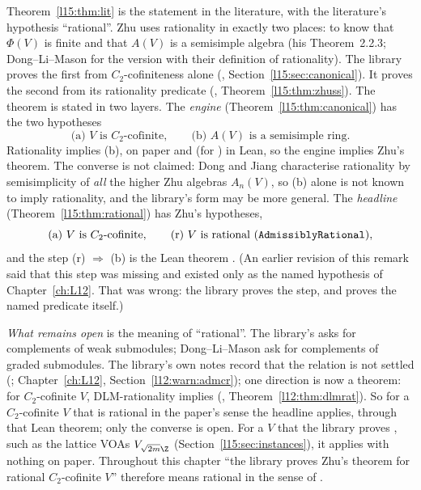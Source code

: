 \begin{remark}\label{l15:rem:hyp}
Theorem~\ref{l15:thm:lit} is the statement in the literature, with the literature's hypothesis ``rational''. Zhu uses
rationality in exactly two places: to know that $\Phi(V)$ is finite and that $A(V)$ is a semisimple algebra (his
Theorem~2.2.3; Dong--Li--Mason for the version with their definition of rationality). The library proves the first from
$C_2$-cofiniteness alone (, Section~\ref{l15:sec:canonical}). It proves the second from
its rationality predicate (\allowbreak{}\allowbreak{}, Theorem~\ref{l15:thm:zhuss}). The theorem is
stated in two layers. The \emph{engine} (Theorem~\ref{l15:thm:canonical}) has the two hypotheses
\begin{equation*}
  \text{(a) } V \text{ is } C_2\text{-cofinite},\qquad \text{(b) } A(V) \text{ is a semisimple ring}.
\end{equation*}
Rationality implies (b), on paper and (for ) in Lean, so the engine implies Zhu's theorem. The
converse is not claimed:
Dong and Jiang characterise rationality by semisimplicity of \emph{all} the higher Zhu algebras $A_n(V)$, so (b) alone is
not known to imply rationality, and the library's form may be more general. The \emph{headline}
(Theorem~\ref{l15:thm:rational}) has Zhu's hypotheses,
\begin{equation*}
  \text{(a) } V \text{ is } C_2\text{-cofinite},\qquad \text{(r) } V \text{ is rational (\texttt{AdmissiblyRational})},
\end{equation*}
and the step (r) $\Rightarrow$ (b) is the Lean theorem \allowbreak{}\allowbreak{}. (An earlier
revision of this remark said that this step was missing and existed only as the named hypothesis
 of Chapter~\ref{ch:L12}. That was wrong: the library proves the step, and
 proves the named predicate itself.)

\emph{What remains open} is the meaning of ``rational''. The library's  asks for complements of
weak submodules; Dong--Li--Mason ask for complements of graded submodules. The library's own notes record that the relation
is not settled (; Chapter~\ref{ch:L12},
Section~\ref{l12:warn:admcr}); one direction is now a theorem: for $C_2$-cofinite $V$, DLM-rationality implies
 (, Theorem~\ref{l12:thm:dlmrat}). So for a $C_2$-cofinite
$V$ that is rational in the paper's sense the headline applies, through that Lean theorem; only the converse is open. For a $V$ that the
library proves , such as the lattice VOAs $V_{\sqrt{2m}\Z}$ (Section~\ref{l15:sec:instances}), it
applies with nothing on paper. Throughout this chapter ``the library proves Zhu's theorem for rational $C_2$-cofinite $V$''
therefore means rational in the sense of .
\end{remark}

